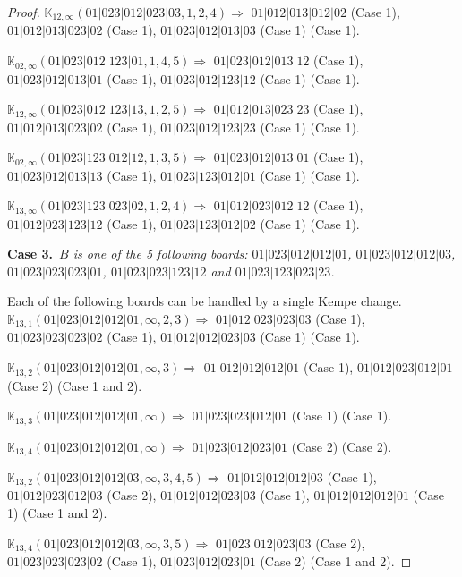 \documentclass[12pt]{article}
\newcommand{\K}{\mathbb{K}}
\newcommand{\case}[2]{{\bf Case #1.}~{\it #2}~~}
\begin{document}
\begin{proof}
\bigskip

$\K_{12,\infty}(01|023|012|023|03,1, 2, 4)\Rightarrow $ $01|012|013|012|02$ (Case 1), $01|012|013|023|02$ (Case 1), $01|023|012|013|03$ (Case 1) (Case 1).

\bigskip

$\K_{02,\infty}(01|023|012|123|01,1, 4, 5)\Rightarrow $ $01|023|012|013|12$ (Case 1), $01|023|012|013|01$ (Case 1), $01|023|012|123|12$ (Case 1) (Case 1).

\bigskip

$\K_{12,\infty}(01|023|012|123|13,1, 2, 5)\Rightarrow $ $01|012|013|023|23$ (Case 1), $01|012|013|023|02$ (Case 1), $01|023|012|123|23$ (Case 1) (Case 1).

\bigskip

$\K_{02,\infty}(01|023|123|012|12,1, 3, 5)\Rightarrow $ $01|023|012|013|01$ (Case 1), $01|023|012|013|13$ (Case 1), $01|023|123|012|01$ (Case 1) (Case 1).

\bigskip

$\K_{13,\infty}(01|023|123|023|02,1, 2, 4)\Rightarrow $ $01|012|023|012|12$ (Case 1), $01|012|023|123|12$ (Case 1), $01|023|123|012|02$ (Case 1) (Case 1).

\bigskip


\bigskip
\case{3}{$B$ is one of the 5 following boards:
 $01|023|012|012|01$, $01|023|012|012|03$, $01|023|023|023|01$, $01|023|023|123|12$ and $01|023|123|023|23$.}

\bigskip

\bigskip

Each of the following boards can be handled by a single Kempe change.
$\K_{13,1}(01|023|012|012|01,\infty,2, 3)\Rightarrow $ $01|012|023|023|03$ (Case 1), $01|023|023|023|02$ (Case 1), $01|012|012|023|03$ (Case 1) (Case 1).

$\K_{13,2}(01|023|012|012|01,\infty,3)\Rightarrow $ $01|012|012|012|01$ (Case 1), $01|012|023|012|01$ (Case 2) (Case 1 and 2).

$\K_{13,3}(01|023|012|012|01,\infty)\Rightarrow $ $01|023|023|012|01$ (Case 1) (Case 1).

$\K_{13,4}(01|023|012|012|01,\infty)\Rightarrow $ $01|023|012|023|01$ (Case 2) (Case 2).


\bigskip

$\K_{13,2}(01|023|012|012|03,\infty,3, 4, 5)\Rightarrow $ $01|012|012|012|03$ (Case 1), $01|012|023|012|03$ (Case 2), $01|012|012|023|03$ (Case 1), $01|012|012|012|01$ (Case 1) (Case 1 and 2).

$\K_{13,4}(01|023|012|012|03,\infty,3, 5)\Rightarrow $ $01|023|012|023|03$ (Case 2), $01|023|023|023|02$ (Case 1), $01|023|012|023|01$ (Case 2) (Case 1 and 2).


\end{proof}
\end{document}
